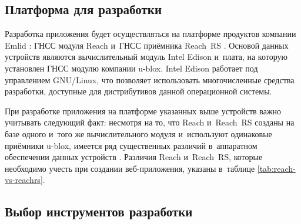 
\subsection{Платформа для разработки}

Разработка приложения будет осуществляться на платформе продуктов компании Emlid \cite{Emlid}: ГНСС модуля Reach \cite{Reach} и~ГНСС приёмника Reach~RS \cite{ReachRS}. Основой данных устройств являются вычислительный модуль Intel Edison и~плата, на которую установлен ГНСС модулю компании u-blox. Intel Edison работает под управлением GNU/Linux, что позволяет использовать многочисленные средства разработки, доступные для дистрибутивов данной операционной системы. \par

При разработке приложения на платформе указанных выше устройств важно учитывать следующий факт: несмотря на то, что Reach и~Reach~RS созданы на базе одного и~того же вычислительного модуля и~используют одинаковые приёмники u-blox, имеется ряд существенных различий в~аппаратном обеспечении данных устройств \cite{Reach, ReachRS}. Различия Reach и~Reach~RS, которые необходимо учесть при создании веб-приложения, указаны в~таблице \ref{tab:reach-vs-reachrs}.


\subsection{Выбор инструментов разработки}



